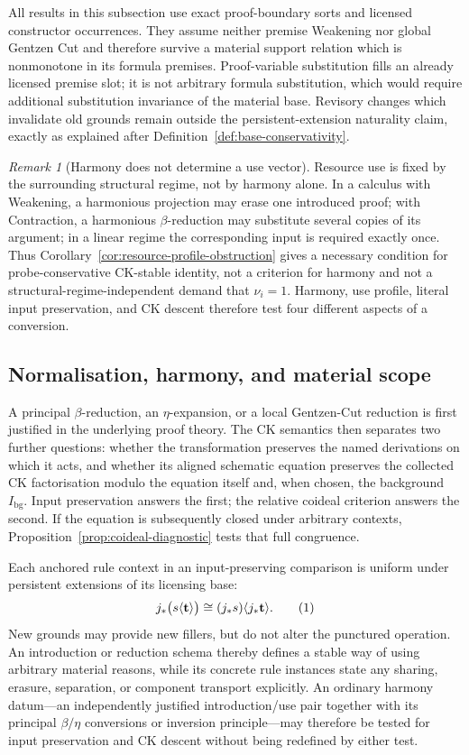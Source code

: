 \documentclass[10pt,a4paper]{article}
\theoremstyle{plain}
\theoremstyle{definition}
\theoremstyle{remark}
\newtheorem{remark}[theorem]{Remark}
\newcommand{\eqtag}{\refstepcounter{equation}\tag{\theequation}}
\begin{document}
All results in this subsection use exact proof-boundary sorts and licensed
constructor occurrences.  They assume neither premise Weakening nor global
Gentzen Cut and therefore survive a material support relation which is
nonmonotone in its formula premises.  Proof-variable substitution fills an
already licensed premise slot; it is not arbitrary formula substitution,
which would require additional substitution invariance of the material
base.  Revisory changes which invalidate old grounds remain outside the
persistent-extension naturality claim, exactly as explained after
Definition~\ref{def:base-conservativity}.

\begin{remark}[Harmony does not determine a use vector]
\label{rem:harmony-structural-demand}
Resource use is fixed by the surrounding structural regime, not by harmony
alone.  In a calculus with Weakening, a harmonious projection may erase one
introduced proof; with Contraction, a harmonious \(\beta\)-reduction may
substitute several copies of its argument; in a linear regime the
corresponding input is required exactly once.  Thus
Corollary~\ref{cor:resource-profile-obstruction} gives a necessary condition
for probe-conservative CK-stable identity, not a criterion for harmony and
not a structural-regime-independent demand that \(\nu_i=1\).
Harmony, use profile, literal input preservation, and CK descent therefore
test four different aspects of a conversion.
\end{remark}

\subsection{Normalisation, harmony, and material scope}

A principal \(\beta\)-reduction, an \(\eta\)-expansion, or a local
Gentzen-Cut reduction is first justified in the underlying proof theory.
The CK semantics then separates two further questions: whether the
transformation preserves the named derivations on which it acts, and
whether its aligned schematic equation preserves the collected CK factorisation
modulo the equation itself and, when chosen, the background
\(I_{\mathrm{bg}}\).
Input preservation answers the first; the relative coideal criterion
answers the second.  If the equation is subsequently closed under arbitrary
contexts, Proposition~\ref{prop:coideal-diagnostic} tests that full
congruence.

Each anchored rule context in an input-preserving comparison is uniform under
persistent extensions of its licensing base:
\[
 j_*\bigl(s\langle\mathbf t\rangle\bigr)
   \cong (j_*s)\langle j_*\mathbf t\rangle .
\eqtag\label{eq:base-transparent-transformation}
\]
New grounds may provide new fillers, but do not alter the punctured
operation.  An introduction or reduction schema thereby defines a
stable way of using arbitrary material reasons, while its concrete rule
instances state any sharing, erasure, separation, or component transport
explicitly.  An ordinary harmony datum---an independently justified
introduction/use pair together with its principal \(\beta/\eta\)
conversions or inversion principle---may therefore be tested for input
preservation and CK descent without being redefined by either test.
\end{document}
